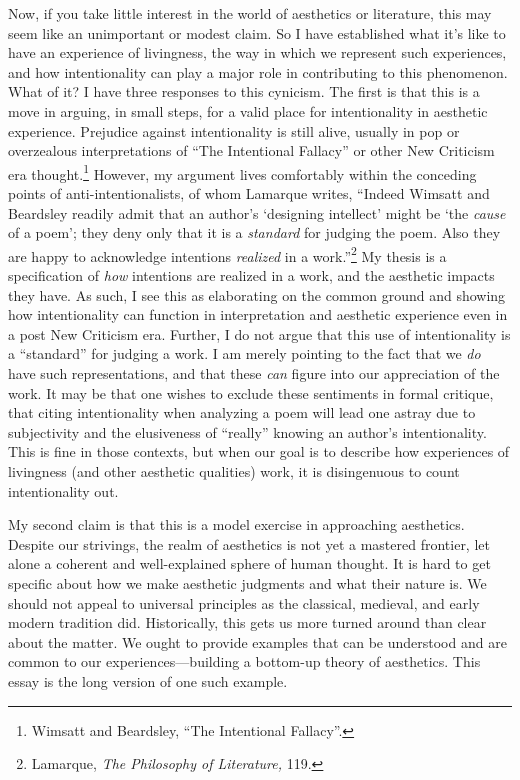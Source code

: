 Now, if you take little interest in the world of aesthetics or
literature, this may seem like an unimportant or modest claim. So I have
established what it's like to have an experience of livingness,
the way in which we represent such experiences, and how intentionality
can play a major role in contributing to this phenomenon. What of it? I
have three responses to this cynicism. The first is that this is a move
in arguing, in small steps, for a valid place for intentionality in
aesthetic experience. Prejudice against intentionality is still alive,
usually in pop or overzealous interpretations of ``The Intentional
Fallacy'' or other New Criticism era thought.\footnote{Wimsatt and
  Beardsley, ``The Intentional Fallacy''.} However, my argument lives
comfortably within the conceding points of anti-intentionalists, of whom
Lamarque writes, ``Indeed Wimsatt and Beardsley readily admit that an
author's `designing intellect' might be `the \emph{cause} of a poem';
they deny only that it is a \emph{standard} for judging the poem. Also
they are happy to acknowledge intentions \emph{realized} in a
work.''\footnote{Lamarque, \emph{The Philosophy of Literature,} 119.} My
thesis is a specification of \emph{how} intentions are realized in a
work, and the aesthetic impacts they have. As such, I see this as
elaborating on the common ground and showing how intentionality can
function in interpretation and aesthetic experience even in a post New
Criticism era. Further, I do not argue that this use of intentionality
is a ``standard'' for judging a work. I am merely pointing to the fact
that we \emph{do} have such representations, and that these \emph{can}
figure into our appreciation of the work. It may be that one wishes to
exclude these sentiments in formal critique, that citing intentionality
when analyzing a poem will lead one astray due to subjectivity and the
elusiveness of ``really'' knowing an author's intentionality. This is
fine in those contexts, but when our goal is to describe how experiences
of livingness (and other aesthetic qualities) work, it is disingenuous
to count intentionality out.

My second claim is that this is a model exercise in approaching
aesthetics. Despite our strivings, the realm of aesthetics is not yet a
mastered frontier, let alone a coherent and well-explained sphere of
human thought. It is hard to get specific about how we make aesthetic
judgments and what their nature is. We should not appeal to universal
principles as the classical, medieval, and early modern tradition did.
Historically, this gets us more turned around than clear about the
matter. We ought to provide examples that can be understood and are
common to our experiences---building a bottom-up theory of aesthetics.
This essay is the long version of one such example.

